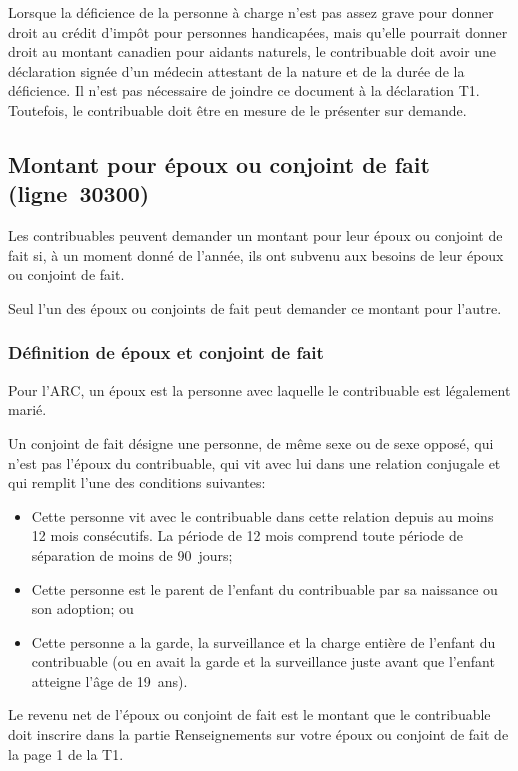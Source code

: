 Lorsque la déficience de la personne à charge n'est pas assez grave pour donner droit au crédit d'impôt pour personnes handicapées, mais qu'elle pourrait donner droit au montant canadien pour aidants naturels, le contribuable doit avoir une déclaration signée d'un médecin attestant de la nature et de la durée de la déficience. Il n'est pas nécessaire de joindre ce document à la déclaration T1. Toutefois, le contribuable doit être en mesure de le présenter sur demande.


\subsection{Montant pour époux ou conjoint de fait (ligne~30300)}
Les contribuables peuvent demander un montant pour leur époux ou conjoint de fait si, à un moment donné de l'année, ils ont subvenu aux besoins de leur époux ou conjoint de fait.

Seul l'un des époux ou conjoints de fait peut demander ce montant pour l'autre.

\subsubsection{Définition de \og époux \fg{} et \og conjoint de fait \fg{}}
Pour l'ARC, un \og époux \fg{} est la personne avec laquelle le contribuable est légalement marié.

Un \og conjoint de fait \fg{} désigne une personne, de même sexe ou de sexe opposé, qui n'est pas l'époux du contribuable, qui vit avec lui dans une relation conjugale et qui remplit l'une des conditions suivantes:
\begin{itemize}
	\item Cette personne vit avec le contribuable dans cette relation depuis au moins 12 mois consécutifs. La période de 12 mois comprend toute période de séparation de moins de 90~jours;
	\item Cette personne est le parent de l'enfant du contribuable par sa naissance ou son adoption; ou
	\item Cette personne a la garde, la surveillance et la charge entière de l'enfant du contribuable (ou en avait la garde et la surveillance juste avant que l'enfant atteigne l'âge de 19~ans).
\end{itemize}

\begin{rappel}
	Le revenu net de l'époux ou conjoint de fait est le montant que le contribuable doit inscrire dans la partie \og Renseignements sur votre époux ou conjoint de fait \fg{} de la page 1 de la T1.
\end{rappel}

